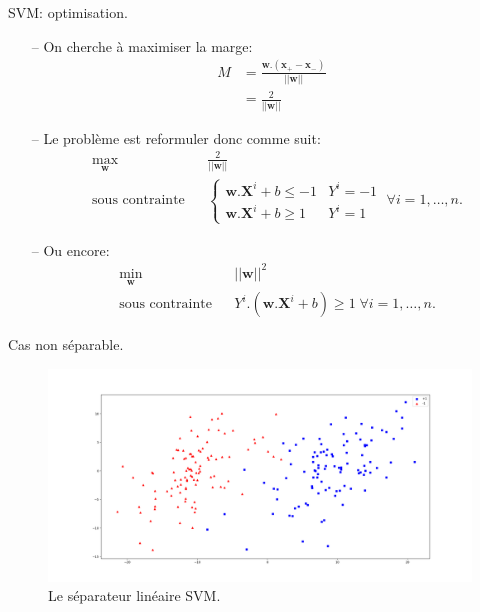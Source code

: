 \documentclass[9pt]{beamer}
\begin{document}
	\begin{frame}{SVM\@: optimisation.}
		\begin{itemize}
			\item[--] On cherche à maximiser la marge:
			\begin{align}
				M &= \frac{\textbf{w}.(\textbf{x}_+ - \textbf{x}_-)}{\vert\vert \textbf{w} \vert\vert} \\
				  &= \frac{2}{\vert\vert \textbf{w} \vert\vert}
			\end{align}
			\item[--] Le problème est reformuler donc comme suit:
			\begin{equation}
				\begin{aligned}
				& \max_{\textbf{w}}
				& & \frac{2}{\vert\vert \textbf{w} \vert\vert} \\
				& \text{sous contrainte}
				& & \begin{cases}
					\textbf{w}.\textbf{X}^i + b \leq -1 & Y^i = -1 \\
					\textbf{w}.\textbf{X}^i + b \geq 1 & Y^i = 1
				\end{cases} \; \forall i = 1, \dots, n.
				\end{aligned}
			\end{equation}
			\item[--] Ou encore:
			\begin{equation}
				\begin{aligned}
				& \min_{\textbf{w}}
				& & {\vert\vert \textbf{w} \vert\vert}^2 \\
				& \text{sous contrainte}
				& & Y^i.(\textbf{w}.\textbf{X}^i + b) \geq 1 \; \forall i = 1, \dots, n.
				\end{aligned}
			\end{equation}
		\end{itemize}
	\end{frame}

	\begin{frame}{Cas non séparable.}
		\begin{figure}[H]
			\includegraphics[width=\textwidth]{non_separable}
			\caption{\label{fig::non_sep} Le séparateur linéaire SVM.}
		\end{figure}
	\end{frame}
\end{document}
